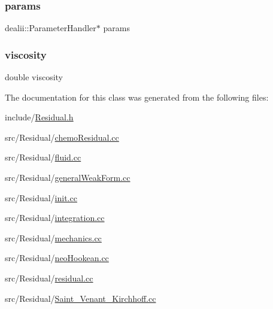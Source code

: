 \subsubsection{\texorpdfstring{params}{params}}
{\footnotesize\ttfamily dealii\+::\+Parameter\+Handler$\ast$ params}

\mbox{\label{class_residual_ad80875e5d1c4362e2eae93663ad723fb}} 
\subsubsection{\texorpdfstring{viscosity}{viscosity}}
{\footnotesize\ttfamily double viscosity}



The documentation for this class was generated from the following files\+:\begin{DoxyCompactItemize}
\item 
include/\mbox{\hyperlink{_residual_8h}{Residual.\+h}}\item 
src/\+Residual/\mbox{\hyperlink{chemo_residual_8cc}{chemo\+Residual.\+cc}}\item 
src/\+Residual/\mbox{\hyperlink{fluid_8cc}{fluid.\+cc}}\item 
src/\+Residual/\mbox{\hyperlink{general_weak_form_8cc}{general\+Weak\+Form.\+cc}}\item 
src/\+Residual/\mbox{\hyperlink{init_8cc}{init.\+cc}}\item 
src/\+Residual/\mbox{\hyperlink{integration_8cc}{integration.\+cc}}\item 
src/\+Residual/\mbox{\hyperlink{mechanics_8cc}{mechanics.\+cc}}\item 
src/\+Residual/\mbox{\hyperlink{neo_hookean_8cc}{neo\+Hookean.\+cc}}\item 
src/\+Residual/\mbox{\hyperlink{residual_8cc}{residual.\+cc}}\item 
src/\+Residual/\mbox{\hyperlink{_saint___venant___kirchhoff_8cc}{Saint\+\_\+\+Venant\+\_\+\+Kirchhoff.\+cc}}\end{DoxyCompactItemize}
